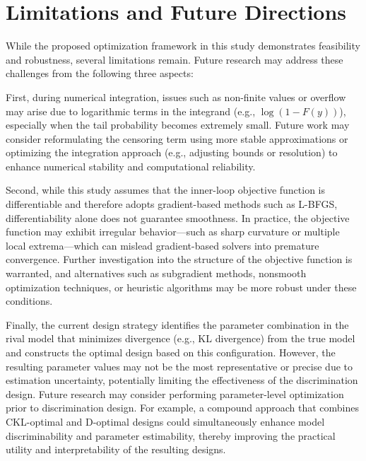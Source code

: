 \section{Limitations and Future Directions}

\hspace*{8mm} While the proposed optimization framework in this study demonstrates feasibility and robustness, several limitations remain. Future research may address these challenges from the following three aspects:

\hspace*{8mm} First, during numerical integration, issues such as non-finite values or overflow may arise due to logarithmic terms in the integrand (e.g., $\log(1 - F(y))$), especially when the tail probability becomes extremely small. Future work may consider reformulating the censoring term using more stable approximations or optimizing the integration approach (e.g., adjusting bounds or resolution) to enhance numerical stability and computational reliability.

\hspace*{8mm} Second, while this study assumes that the inner-loop objective function is differentiable and therefore adopts gradient-based methods such as L-BFGS, differentiability alone does not guarantee smoothness. In practice, the objective function may exhibit irregular behavior—such as sharp curvature or multiple local extrema—which can mislead gradient-based solvers into premature convergence. Further investigation into the structure of the objective function is warranted, and alternatives such as subgradient methods, nonsmooth optimization techniques, or heuristic algorithms may be more robust under these conditions.

\hspace*{8mm} Finally, the current design strategy identifies the parameter combination in the rival model that minimizes divergence (e.g., KL divergence) from the true model and constructs the optimal design based on this configuration. However, the resulting parameter values may not be the most representative or precise due to estimation uncertainty, potentially limiting the effectiveness of the discrimination design. Future research may consider performing parameter-level optimization prior to discrimination design. For example, a compound approach that combines CKL-optimal and D-optimal designs could simultaneously enhance model discriminability and parameter estimability, thereby improving the practical utility and interpretability of the resulting designs.